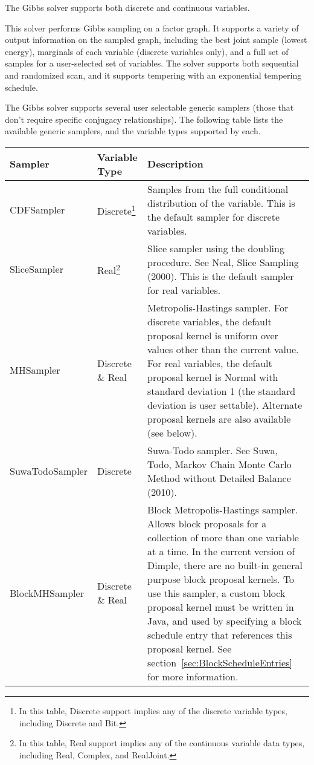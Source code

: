 The Gibbs solver supports both discrete and continuous variables.

This solver performs Gibbs sampling on a factor graph.  It supports a variety of output information on the sampled graph, including the best joint sample (lowest energy), marginals of each variable (discrete variables only), and a full set of samples for a user-selected set of variables.  The solver supports both sequential and randomized scan, and it supports tempering with an exponential tempering schedule.

The Gibbs solver supports several user selectable generic samplers (those that don't require specific conjugacy relationships).  The following table lists the available generic samplers, and the variable types supported by each.

\begin{longtable} {l l p{8.0cm}}
Sampler & Variable Type &  Description \\
\hline
\endhead
CDFSampler & Discrete\footnote{In this table, Discrete support implies any of the discrete variable types, including Discrete and Bit.} & Samples from the full conditional distribution of the variable.  This is the default sampler for discrete variables. \\
SliceSampler & Real\footnote{In this table, Real support implies any of the continuous variable data types, including Real, Complex, and RealJoint.} & Slice sampler using the doubling procedure.  See Neal, Slice Sampling (2000).  This is the default sampler for real variables. \\
MHSampler & Discrete \& Real & Metropolis-Hastings sampler.  For discrete variables, the default proposal kernel is uniform over values other than the current value.  For real variables, the default proposal kernel is Normal with standard deviation 1 (the standard deviation is user settable).  Alternate proposal kernels are also available (see below). \\
SuwaTodoSampler & Discrete & Suwa-Todo sampler.  See Suwa, Todo, Markov Chain Monte Carlo Method without Detailed Balance (2010). \\
BlockMHSampler & Discrete \& Real & Block Metropolis-Hastings sampler.  Allows block proposals for a collection of more than one variable at a time.  In the current version of Dimple, there are no built-in general purpose block proposal kernels.  To use this sampler, a custom block proposal kernel must be written in Java, and used by specifying a block schedule entry that references this proposal kernel.  See section~\ref{sec:BlockScheduleEntries} for more information.
\end{longtable}


